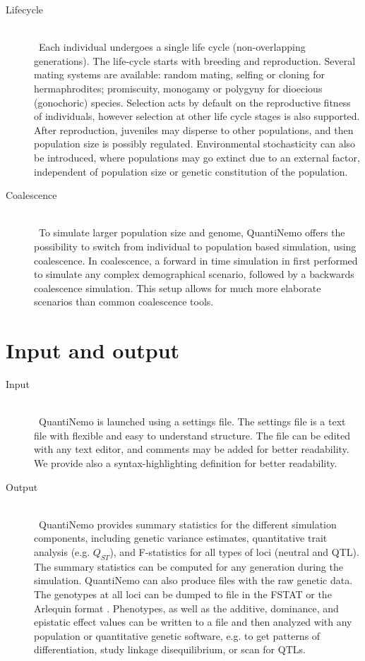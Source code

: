 \documentclass[letterpaper,12pt,oneside]{book}
\begin{document}
\begin{description}
\item[Lifecycle]\hspace*{\fill}\\\
Each individual undergoes a single life cycle (non-overlapping generations). The life-cycle starts with breeding and reproduction. Several mating systems are available: random mating, selfing or cloning for hermaphrodites; promiscuity, monogamy or polygyny for dioecious (gonochoric) species. Selection acts by default on the reproductive fitness of individuals, however selection at other life cycle stages is also supported. After reproduction, juveniles may disperse to other populations, and then population size is possibly regulated. Environmental stochasticity can also be introduced, where populations may go extinct due to an external factor, independent of population size or genetic constitution of the population.

\item[Coalescence]\hspace*{\fill}\\\
To simulate larger population size and genome, QuantiNemo offers the possibility to switch from individual to population based simulation, using coalescence. In coalescence, a forward in time simulation in first performed to simulate any complex demographical scenario, followed by a backwards coalescence simulation. This setup allows for much more elaborate scenarios than common coalescence tools. 
\end{description}


\section{Input and output}
\begin{description}
\item[Input]\hspace*{\fill}\\\
QuantiNemo is launched using a settings file. The settings file is a text file with flexible and easy to understand structure. The file can be edited with any text editor, and comments may be added for better readability. We provide also a syntax-highlighting definition for better readability.  

\item[Output]\hspace*{\fill}\\\
QuantiNemo provides summary statistics for the different simulation components, including genetic variance estimates, quantitative trait analysis (e.g. $Q_{ST}$), and F-statistics for all types of loci (neutral and QTL). The summary statistics can be computed for any generation during the simulation. QuantiNemo can also produce files with the raw genetic data. The genotypes at all loci can be dumped to file in the FSTAT \citep{Goudet_1995} or the Arlequin format \citep{Excoffier_2010}. Phenotypes, as well as the additive, dominance, and epistatic effect values can be written to a file and then analyzed with any population or quantitative genetic software, e.g.  to get patterns of differentiation, study linkage disequilibrium, or scan for QTLs.
\end{description}
\end{document}
